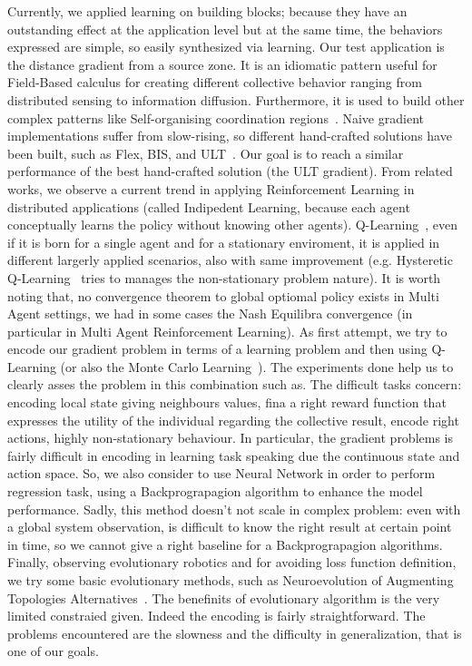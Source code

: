 \documentclass[conference]{IEEEtran}
\begin{document}
Currently, we applied learning on building blocks; because they have an outstanding effect at the application level but
at the same time, the behaviors expressed are simple, so easily synthesized via learning.  %
%
Our test application is the distance gradient from a source zone. 
It is an idiomatic pattern useful for Field-Based calculus for creating different collective behavior ranging from distributed sensing to information diffusion.
Furthermore, it is used to build other complex patterns like Self-organising coordination regions~\cite{DBLP:conf/coordination/CasadeiPVN19}.
%
Naive gradient implementations suffer from slow-rising, so different hand-crafted solutions have been built, such as Flex, BIS, and ULT~\cite{DBLP:conf/saso/AudritoCDV17}.
Our goal is to reach a similar performance of the best hand-crafted solution (the ULT gradient).
%
From related works, we observe a current trend in applying Reinforcement Learning in distributed applications (called Indipedent Learning, because each agent conceptually learns the policy without knowing other agents).
Q-Learning~\cite{DBLP:journals/ras/Krose95}, even if it is born for a single agent and for a stationary enviroment, it is applied in 
different largerly applied scenarios, also with same improvement (e.g. Hysteretic Q-Learning~\cite{DBLP:conf/iros/MatignonLF07} tries to 
manages the non-stationary problem nature). It is worth noting that, no convergence theorem to global optiomal policy exists in Multi Agent settings, we had in some cases
the Nash Equilibra convergence (in particular in Multi Agent Reinforcement Learning).
%
As first attempt, we try to encode our gradient problem in terms of a learning problem and then using Q-Learning (or also the Monte Carlo Learning~\cite{DBLP:conf/nips/Thrun99}).
The experiments done help us to clearly asses the problem in this combination such as. 
The difficult tasks concern: encoding local state giving neighbours values, fina a right reward function that expresses the utility of 
the individual regarding the collective result, encode right actions, highly non-stationary behaviour. 
In particular, the gradient problems is fairly difficult in encoding in learning task speaking due the continuous state and action space.
So, we also consider to use Neural Network in order to perform regression task, using a Backprograpagion algorithm to 
enhance the model performance. 
Sadly, this method doesn't not scale in complex problem: even with a global system observation, is difficult to know the right result at certain point in time, so 
we cannot give a right baseline for a Backprograpagion algorithms.
%
Finally, observing evolutionary robotics and for avoiding loss function definition, we try some basic evolutionary methods, such as Neuroevolution of Augmenting Topologies Alternatives~\cite{DBLP:journals/ec/StanleyM02}.
The benefinits of evolutionary algorithm is the very limited constraied given. Indeed the encoding is fairly straightforward.
The problems encountered are the slowness and the difficulty in generalization, that is one of our goals.
%
\end{document}
